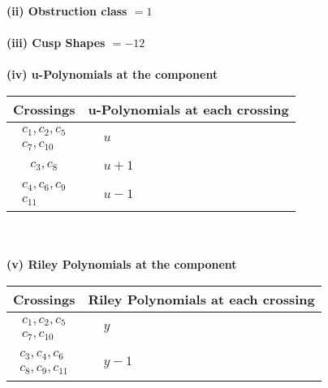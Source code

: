 \documentclass[1p]{elsarticle_modified}
\theoremstyle{definition}
\begin{document}
\flushleft \textbf{(ii) Obstruction class $= 1$}\\~\\
\flushleft \textbf{(iii) Cusp Shapes $= -12$}\\~\\
\newpage\renewcommand{\arraystretch}{1}
\flushleft \textbf{(iv) u-Polynomials at the component}\newline \\
\begin{tabular}{m{50pt}|m{274pt}}
Crossings & \hspace{64pt}u-Polynomials at each crossing \\
\hline $$\begin{aligned}c_{1},c_{2},c_{5}\\c_{7},c_{10}\end{aligned}$$&$\begin{aligned}
&u
\end{aligned}$\\
\hline $$\begin{aligned}c_{3},c_{8}\end{aligned}$$&$\begin{aligned}
&u+1
\end{aligned}$\\
\hline $$\begin{aligned}c_{4},c_{6},c_{9}\\c_{11}\end{aligned}$$&$\begin{aligned}
&u-1
\end{aligned}$\\
\hline
\end{tabular}\\~\\
\newpage\renewcommand{\arraystretch}{1}
\flushleft \textbf{(v) Riley Polynomials at the component}\newline \\
\begin{tabular}{m{50pt}|m{274pt}}
Crossings & \hspace{64pt}Riley Polynomials at each crossing \\
\hline $$\begin{aligned}c_{1},c_{2},c_{5}\\c_{7},c_{10}\end{aligned}$$&$\begin{aligned}
&y
\end{aligned}$\\
\hline $$\begin{aligned}c_{3},c_{4},c_{6}\\c_{8},c_{9},c_{11}\end{aligned}$$&$\begin{aligned}
&y-1
\end{aligned}$\\
\hline
\end{tabular}\\~\\
\end{document}
